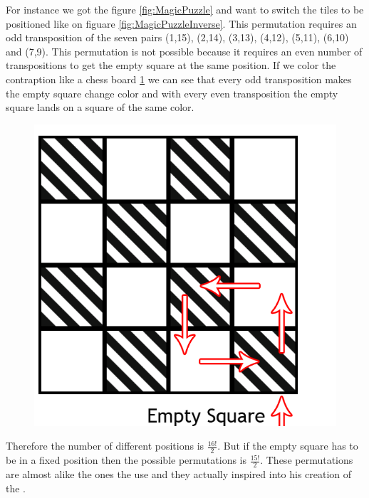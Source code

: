For instance we got the figure \ref{fig:MagicPuzzle} and want to switch the tiles to be positioned like on figuare \ref{fig:MagicPuzzleInverse}. This permutation requires an odd transposition of the seven pairs (1,15), (2,14), (3,13), (4,12), (5,11), (6,10) and (7,9). This permutation is not possible because it requires an even number of transpositions to get the empty square at the same position. If we color the contraption like a chess board \ref{fig:Chess} we can see that every odd transposition makes the empty square change color and with every even transposition the empty square lands on a square of the same color.

\begin{figure}[!h]
\begin{center}
\includegraphics[scale=0.2]{input/pics/MagicPuzzle(EmptySquare).png}
\caption{}
\label{fig:Chess}
\end{center}
\end{figure}

Therefore the number of different positions is $\frac{16!}{2}$. But if the empty square has to be in a fixed position then the possible permutations is $\frac{15!}{2}$. These permutations are almost alike the ones the \rubik{} use and they actually inspired \erno{} into his creation of the \rubik{}.